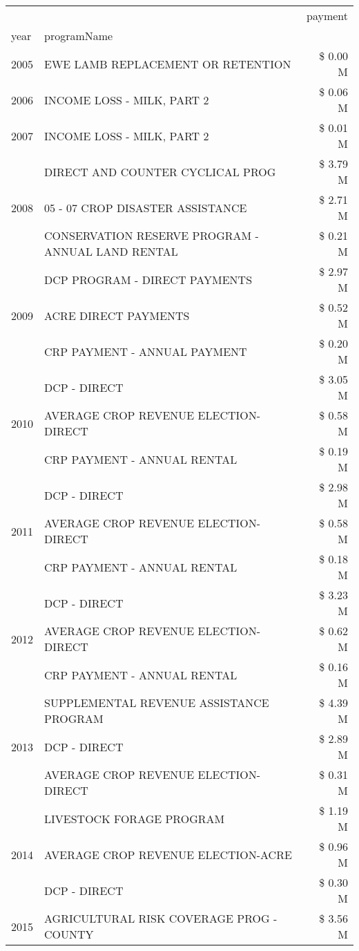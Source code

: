 \begin{tabular}{llr}
\toprule
 &  & payment \\
year & programName &  \\
\midrule
2005 & EWE LAMB REPLACEMENT OR RETENTION & \$ 0.00 M \\
\cline{1-3}
2006 & INCOME LOSS - MILK, PART 2 & \$ 0.06 M \\
\cline{1-3}
2007 & INCOME LOSS - MILK, PART 2 & \$ 0.01 M \\
\cline{1-3}
\multirow[t]{3}{*}{2008} & DIRECT AND COUNTER CYCLICAL PROG & \$ 3.79 M \\
 & 05 - 07 CROP DISASTER ASSISTANCE & \$ 2.71 M \\
 & CONSERVATION RESERVE PROGRAM - ANNUAL LAND RENTAL & \$ 0.21 M \\
\cline{1-3}
\multirow[t]{3}{*}{2009} & DCP PROGRAM - DIRECT PAYMENTS & \$ 2.97 M \\
 & ACRE DIRECT PAYMENTS & \$ 0.52 M \\
 & CRP PAYMENT - ANNUAL PAYMENT & \$ 0.20 M \\
\cline{1-3}
\multirow[t]{3}{*}{2010} & DCP - DIRECT & \$ 3.05 M \\
 & AVERAGE CROP REVENUE ELECTION-DIRECT & \$ 0.58 M \\
 & CRP PAYMENT - ANNUAL RENTAL & \$ 0.19 M \\
\cline{1-3}
\multirow[t]{3}{*}{2011} & DCP - DIRECT & \$ 2.98 M \\
 & AVERAGE CROP REVENUE ELECTION-DIRECT & \$ 0.58 M \\
 & CRP PAYMENT - ANNUAL RENTAL & \$ 0.18 M \\
\cline{1-3}
\multirow[t]{3}{*}{2012} & DCP - DIRECT & \$ 3.23 M \\
 & AVERAGE CROP REVENUE ELECTION-DIRECT & \$ 0.62 M \\
 & CRP PAYMENT - ANNUAL RENTAL & \$ 0.16 M \\
\cline{1-3}
\multirow[t]{3}{*}{2013} & SUPPLEMENTAL REVENUE ASSISTANCE PROGRAM & \$ 4.39 M \\
 & DCP - DIRECT & \$ 2.89 M \\
 & AVERAGE CROP REVENUE ELECTION-DIRECT & \$ 0.31 M \\
\cline{1-3}
\multirow[t]{3}{*}{2014} & LIVESTOCK FORAGE PROGRAM & \$ 1.19 M \\
 & AVERAGE CROP REVENUE ELECTION-ACRE & \$ 0.96 M \\
 & DCP - DIRECT & \$ 0.30 M \\
\cline{1-3}
\multirow[t]{3}{*}{2015} & AGRICULTURAL RISK COVERAGE PROG - COUNTY & \$ 3.56 M \\

\end{tabular}
